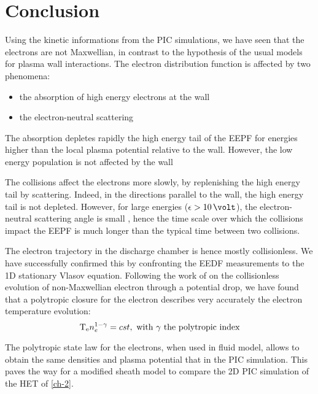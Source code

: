 
\section{Conclusion }
\label{sec-ch3conclusion}

Using the kinetic informations from the \ac{PIC} simulations, we have seen that the electrons are not Maxwellian, in contrast to the hypothesis of the usual models for plasma wall interactions.
The electron distribution function is affected by two phenomena\string:
\begin{itemize}
  \item the absorption of high energy electrons at the wall
  \item the electron-neutral scattering
\end{itemize}
\vspace{1em}
The absorption depletes rapidly the high energy tail of the EEPF for energies higher than the local plasma potential relative to the wall.
However, the low energy population is not affected by the wall

The collisions affect the electrons more slowly, by replenishing the high energy tail by scattering.
Indeed, in the directions parallel to the wall, the high energy tail is not depleted.
However, for large energies ($\ek > 10\,\volt$), the electron-neutral scattering angle is small \citep{vahedi1995}, hence the time scale over which the collisions impact the EEPF is much longer than the typical time between two collisions.

The electron trajectory in the discharge chamber is hence mostly collisionless.
We have successfully confirmed this by confronting the EEDF measurements to the 1D stationary Vlasov equation.
Following the work of \citet{zhang2016} on the collisionless evolution of non-Maxwellian electron through a potential drop, we have found that a polytropic closure for the electron describes very accurately the electron temperature evolution\string:
\begin{equation*} \label{eq-polyp2}
  \mathrm{T_e} n_e^{1-\gamma} = cst, \text{ with $\gamma$ the polytropic index}
\end{equation*}

The polytropic state law for the electrons, when used in fluid model, allows to obtain the same densities and plasma potential that in the \ac{PIC} simulation.
This paves the way for a modified sheath model to compare the \ac{2D} \ac{PIC} simulation of the \ac{HET} of \cref{ch-2}.


